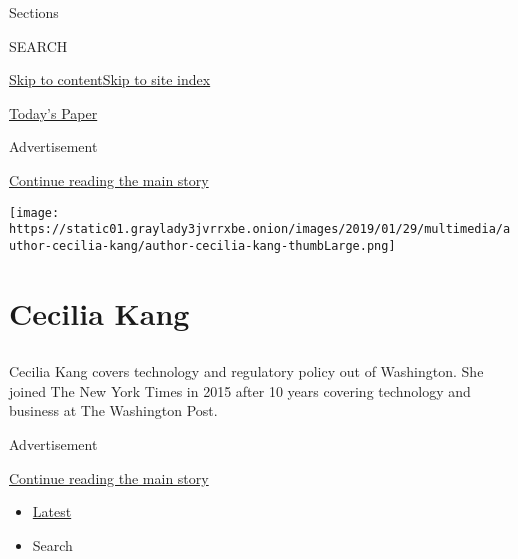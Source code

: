 Sections

SEARCH

\protect\hyperlink{site-content}{Skip to
content}\protect\hyperlink{site-index}{Skip to site index}

\href{https://myaccount.nytimes3xbfgragh.onion/auth/login?response_type=cookie\&client_id=vi}{}

\href{https://www.nytimes3xbfgragh.onion/section/todayspaper}{Today's
Paper}

Advertisement

\protect\hyperlink{after-top}{Continue reading the main story}

\texttt{[image: https://static01.graylady3jvrrxbe.onion/images/2019/01/29/multimedia/author-cecilia-kang/author-cecilia-kang-thumbLarge.png]}

\hypertarget{cecilia-kang}{%
\section{Cecilia Kang}\label{cecilia-kang}}

\hypertarget{section}{%
\subsection{}\label{section}}

Cecilia Kang covers technology and regulatory policy out of Washington.
She joined The New York Times in 2015 after 10 years covering technology
and business at The Washington Post.

Advertisement

\protect\hyperlink{after-mid1}{Continue reading the main story}

\begin{itemize}
\tightlist
\item
  \protect\hyperlink{stream-panel}{Latest}
\item
  Search
\end{itemize}

